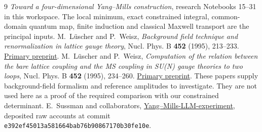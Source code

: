 \documentclass[11pt]{article}
\theoremstyle{remark}
\begin{document}
\begin{thebibliography}{9}
\emph{Toward a four-dimensional Yang--Mills construction},
research Notebooks 15--31 in this workspace.
The local minimum, exact constrained integral, common-domain
quantum map, finite induction and classical Maxwell transport
are the principal inputs.
M.~L\"uscher and P.~Weisz,
\emph{Background field technique and renormalization in lattice
gauge theory}, Nucl. Phys. B \textbf{452} (1995), 213--233.
\href{https://arxiv.org/abs/hep-lat/9504006}{Primary preprint}.
M.~L\"uscher and P.~Weisz,
\emph{Computation of the relation between the bare lattice
coupling and the MS coupling in SU(N) gauge theories to two
loops}, Nucl. Phys. B \textbf{452} (1995), 234--260.
\href{https://arxiv.org/abs/hep-lat/9505011}{Primary preprint}.
These papers supply background-field formalism and reference
amplitudes to investigate. They are not used here as a proof of
the required comparison with our constrained determinant.
E.~Sussman and collaborators,
\href{https://github.com/ethanwsussman/Yang--Mills-LLM-experiment}
{Yang--Mills-LLM-experiment}, deposited raw accounts at commit
\texttt{e392ef4501\allowbreak 3a581664ba\allowbreak b76b908671\allowbreak 70b30fe10e}.
\end{thebibliography}
\end{document}
